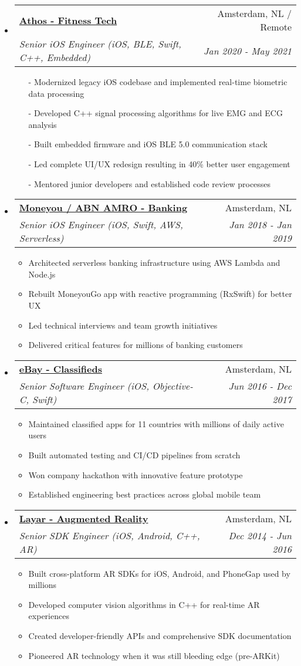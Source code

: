 \documentclass[letterpaper,11pt]{article}
\makeatletter
\newcommand{\resitem}[1]{\item #1 \vspace{-2pt}}
\newcommand{\ressubheading}[4]{
\begin{tabular*}{7.0in}{l@{\extracolsep{\fill}}r}
    \textbf{#1} & #2 \\
    \textit{#3} & \textit{#4} \\
\end{tabular*}\vspace{-6pt}}
\makeatother
\begin{document}
\begin{itemize}
\item
    \ressubheading{\href{https://www.crunchbase.com/organization/athos}{Athos - Fitness Tech}}{Amsterdam, NL / Remote}{Senior iOS Engineer (iOS, BLE, Swift, C++, Embedded)}{Jan 2020 - May 2021}
    \begin{itemize}
        \item[-]{Modernized legacy iOS codebase and implemented real-time biometric data processing}
        \item[-]{Developed C++ signal processing algorithms for live EMG and ECG analysis}
        \item[-]{Built embedded firmware and iOS BLE 5.0 communication stack}
        \item[-]{Led complete UI/UX redesign resulting in 40\% better user engagement}
        \item[-]{Mentored junior developers and established code review processes}
    \end{itemize}
    
\item
    \ressubheading{\href{https://www.moneyou.nl/}{Moneyou / ABN AMRO - Banking}}{Amsterdam, NL}{Senior iOS Engineer (iOS, Swift, AWS, Serverless)}{Jan 2018 - Jan 2019}
    \begin{itemize}
        \resitem{Architected serverless banking infrastructure using AWS Lambda and Node.js}
        \resitem{Rebuilt MoneyouGo app with reactive programming (RxSwift) for better UX}
        \resitem{Led technical interviews and team growth initiatives}
        \resitem{Delivered critical features for millions of banking customers}
    \end{itemize}
        
\item
    \ressubheading{\href{https://www.markplaats.nl/}{eBay - Classifieds}}{Amsterdam, NL}{Senior Software Engineer (iOS, Objective-C, Swift)}{Jun 2016 - Dec 2017}
    \begin{itemize}
        \resitem{Maintained classified apps for 11 countries with millions of daily active users}
        \resitem{Built automated testing and CI/CD pipelines from scratch}
        \resitem{Won company hackathon with innovative feature prototype}
        \resitem{Established engineering best practices across global mobile team}
    \end{itemize}

\item
    \ressubheading{\href{https://www.layar.com/}{Layar - Augmented Reality}}{Amsterdam, NL}{Senior SDK Engineer (iOS, Android, C++, AR)}{Dec 2014 - Jun 2016}
    \begin{itemize}
        \resitem{Built cross-platform AR SDKs for iOS, Android, and PhoneGap used by millions}
        \resitem{Developed computer vision algorithms in C++ for real-time AR experiences}
        \resitem{Created developer-friendly APIs and comprehensive SDK documentation}
        \resitem{Pioneered AR technology when it was still bleeding edge (pre-ARKit)}
    \end{itemize}


\end{itemize}
\end{document}
